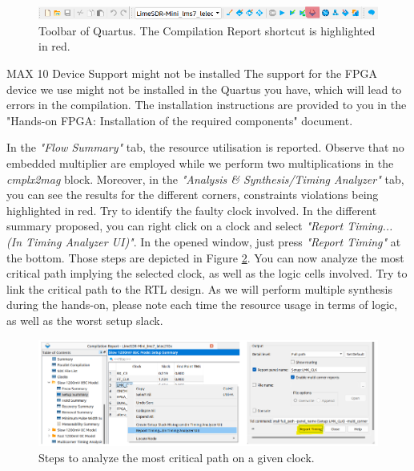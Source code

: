 \begin{figure}[!h]
    \centering
    \includegraphics[width=\linewidth]{figures/Compilation_report_button.PNG}
    \caption{Toolbar of Quartus. The Compilation Report shortcut is highlighted in red.}
    \label{fig:compilation_report_button}
\end{figure}

\begin{bclogo}[couleur = gray!20, arrondi = 0.2, logo=\bcattention]{MAX 10 Device Support might not be installed}
    The support for the FPGA device we use might not be installed in the Quartus you have, which will lead to errors in the compilation. The installation instructions are provided to you in the "Hands-on FPGA: Installation of the required components" document.

\end{bclogo}

In the \textit{"Flow Summary"} tab, the resource utilisation is reported. Observe that no embedded multiplier are employed while we perform two multiplications in the \textit{cmplx2mag} block. Moreover, in the \textit{"Analysis \& Synthesis/Timing Analyzer"} tab, you can see the results for the different corners, constraints violations being highlighted in red. Try to identify the faulty clock involved. In the different summary proposed, you can right click on a clock and select \textit{"Report Timing... (In Timing Analyzer UI)"}. In the opened window, just press \textit{"Report Timing"} at the bottom. Those steps are depicted in Figure \ref{fig:report_timing_analyzer}. You can now analyze the most critical path implying the selected clock, as well as the logic cells involved. Try to link the critical path to the RTL design. As we will perform multiple synthesis during the hands-on, please note each time the resource usage in terms of logic, as well as the worst setup slack.

\begin{figure}[!h]
    \centering
    \includegraphics[width=\linewidth]{figures/Report_Timing_Analyzer.png}
    \caption{Steps to analyze the most critical path on a given clock.}
    \label{fig:report_timing_analyzer}
\end{figure}

